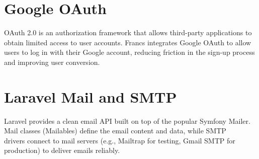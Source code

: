 \section{Google OAuth}
OAuth 2.0 is an authorization framework that allows third-party applications to obtain limited access to user accounts. Francs integrates Google OAuth to allow users to log in with their Google account, reducing friction in the sign-up process and improving user conversion.

\section{Laravel Mail and SMTP}
Laravel provides a clean email API built on top of the popular Symfony Mailer. Mail classes (Mailables) define the email content and data, while SMTP\\ drivers connect to mail servers (e.g., Mailtrap for testing, Gmail SMTP for production) to deliver emails reliably.
